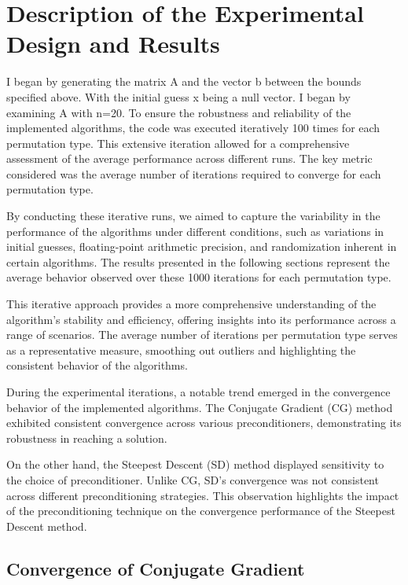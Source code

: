 \documentclass[12pt, letterpaper]{article}
\begin{document}
\section{Description of the Experimental Design and Results}

I began by generating the matrix A and the vector b between the bounds specified above. With the initial guess x being a null vector. I began by examining A with n=20. To ensure the robustness and reliability of the implemented algorithms, the code was executed iteratively 100 times for each permutation type. This extensive iteration allowed for a comprehensive assessment of the average performance across different runs. The key metric considered was the average number of iterations required to converge for each permutation type.

By conducting these iterative runs, we aimed to capture the variability in the performance of the algorithms under different conditions, such as variations in initial guesses, floating-point arithmetic precision, and randomization inherent in certain algorithms. The results presented in the following sections represent the average behavior observed over these 1000 iterations for each permutation type.

This iterative approach provides a more comprehensive understanding of the algorithm's stability and efficiency, offering insights into its performance across a range of scenarios. The average number of iterations per permutation type serves as a representative measure, smoothing out outliers and highlighting the consistent behavior of the algorithms.

During the experimental iterations, a notable trend emerged in the convergence behavior of the implemented algorithms. The Conjugate Gradient (CG) method exhibited consistent convergence across various preconditioners, demonstrating its robustness in reaching a solution.

On the other hand, the Steepest Descent (SD) method displayed sensitivity to the choice of preconditioner. Unlike CG, SD's convergence was not consistent across different preconditioning strategies. This observation highlights the impact of the preconditioning technique on the convergence performance of the Steepest Descent method.

\subsection*{Convergence of Conjugate Gradient}
\end{document}
